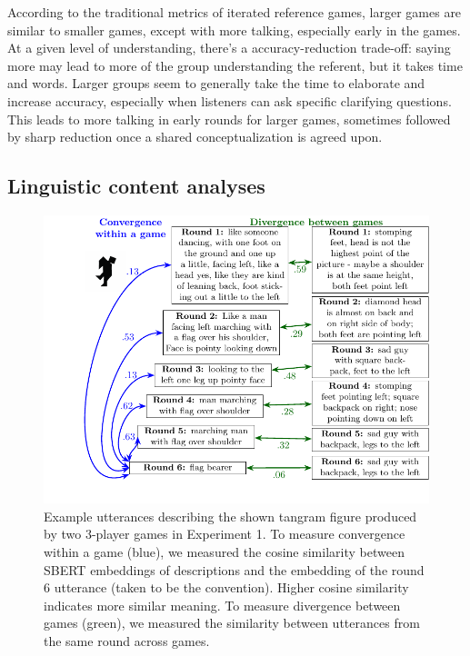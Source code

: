 \documentclass[
  english,
  a4paper,
]{article}
\begin{document}
According to the traditional metrics of iterated reference games, larger games are similar to smaller games, except with more talking, especially early in the games. At a given level of understanding, there's a accuracy-reduction trade-off: saying more may lead to more of the group understanding the referent, but it takes time and words. Larger groups seem to generally take the time to elaborate and increase accuracy, especially when listeners can ask specific clarifying questions. This leads to more talking in early rounds for larger games, sometimes followed by sharp reduction once a shared conceptualization is agreed upon.

\hypertarget{linguistic-content-analyses}{%
\subsection{Linguistic content analyses}\label{linguistic-content-analyses}}

\begin{figure}[t!]

{\centering \includegraphics[width=1\linewidth]{sbert} 

}

\caption{Example utterances describing the shown tangram figure produced by two 3-player games in Experiment 1. To measure convergence within a game (blue), we measured the cosine similarity between SBERT embeddings of descriptions and the embedding of the round 6 utterance (taken to be the convention). Higher cosine similarity indicates more similar meaning. To measure divergence between games (green), we measured the similarity between utterances from the same round across games.}\label{fig:sbert-diagram}
\end{figure}
\end{document}
